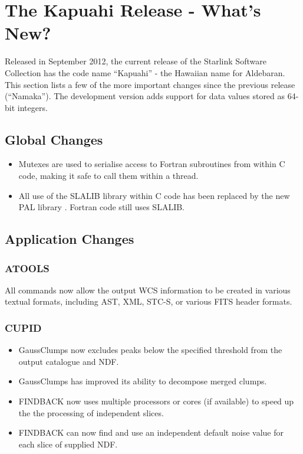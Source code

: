 \section{The Kapuahi Release - What's New?}
Released in September 2012, the current release of the Starlink Software Collection has the code name ``Kapuahi'' - the Hawaiian name for Aldebaran. This section lists a few of the more important changes since the previous release (``Namaka''). The development version adds support for data values stored as 64-bit integers.

\subsection{Global Changes}
\begin{itemize}
\item Mutexes are used to serialise access to Fortran subroutines from within C code, making it safe to call them within a thread.
\item All use of the SLALIB library within C code has been replaced by the new PAL library \citep{P56_adassxxii}. Fortran code still uses SLALIB.
\end{itemize}

\subsection{Application Changes}

\subsubsection{ATOOLS}
All commands now allow the output WCS information to be created in various textual formats, including AST, XML, STC-S, or various FITS header formats.

\subsubsection{CUPID}
\begin{itemize}
\item GaussClumps now excludes peaks below the specified threshold from the output catalogue and NDF.
\item GaussClumps has improved its ability to decompose merged clumps.
\item FINDBACK now uses multiple processors or cores (if available) to speed up the the processing of independent slices.
\item FINDBACK can now find and use an independent default noise value for each slice of supplied NDF.
\end{itemize}

